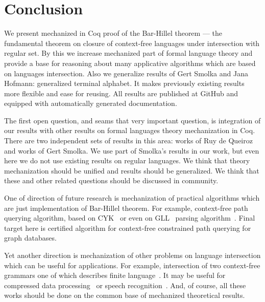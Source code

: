 \section{Conclusion}
\label{sec:conclusion}

We present mechanized in Coq proof of the Bar-Hillel theorem --- the fundamental theorem on closure of context-free languages under intersection with regular set.
By this we increase mechanized part of formal language theory and provide a base for reasoning about many applicative algorithms which are based on languages intersection.
Also we generalize results of Gert Smolka and Jana Hofmann: generalized terminal alphabet. 
It makes previously existing results more flexible and ease for reusing.
All results are published at GitHub and equipped with automatically generated documentation.

The first open question, and seams that very important question, is integration of our results with other results on formal languages theory mechanization in Coq. 
There are two independent sets of results in this area: works of Ruy de Queiroz and works of Gert Smolka.
We use part of Smolka's results in our work, but even here we do not use existing results on regular languages.
We think that theory mechanization should be unified and results should be generalized.
We think that these and other related questions should be discussed in community.

One of direction of future research is mechanization of practical algorithms which are just implementation of Bar-Hillel theorem.
For example, context-free path querying algorithm, based on CYK~\cite{hellingsPathQuerying,zhang2016context} or even on GLL~\cite{scott2010gll} parsing algorithm~\cite{grigorev2016context}.
Final target here is certified algorithm for context-free constrained path querying for graph databases.

Yet another direction is mechanization of other problems on language intersection which can be useful for applications.
For example, intersection of two context-free grammars one of which describes finite language~\cite{nederhof2002parsing, nederhof2004language}.
It may be useful for compressed data processing~\cite{!!!} or speech recognition~\cite{!!!}.
And, of course, all these works should be done on the common base of mechanized theoretical results.



